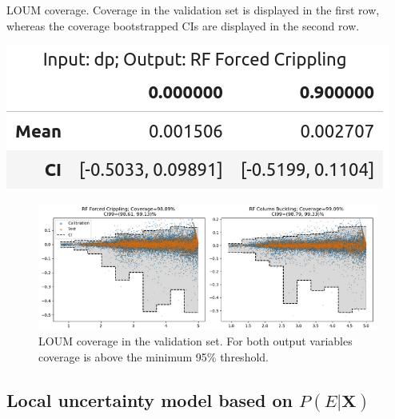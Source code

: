 \begin{table}[!htb]
	\centering
	\caption{LOUM coverage. Coverage in the validation set is displayed in the first row, whereas the coverage bootstrapped CIs are displayed in the second row.}
	\includegraphics[scale=\tabscale]{Figures/uncertainty/loumtab2.png}
	\label{tab:loumtab2}
\end{table}
\begin{figure}
	\centering
	\includegraphics[width=\textwidth]{Figures/uncertainty/loumcoverage.png}
	\caption{LOUM coverage in the validation set. For both output variables coverage is above the minimum 95\% threshold.}
	\label{fig:loum1}
\end{figure}

\subsection{Local uncertainty model based on $P(E|\mathbf{X})$}
